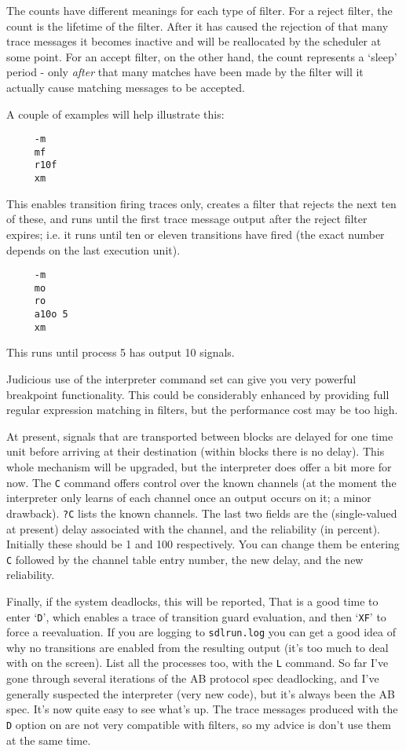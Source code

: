 The counts have different meanings for each type of filter. For a
reject filter, the count is the lifetime of the filter. After it has
caused the rejection of that many trace messages it becomes inactive
and will be reallocated by the scheduler at some point.
For an accept filter, on the other hand, the count represents a
`sleep' period - only {\em after} that many matches have been made
by the filter will it actually cause matching messages to be
accepted.

A couple of examples will help illustrate this:

\begin{verbatim}
     -m
     mf
     r10f
     xm
\end{verbatim}

This enables transition firing traces only, creates a filter that
rejects the next ten of these, and runs until the first trace message
output after the reject filter expires; i.e. it runs until ten or
eleven transitions have fired (the exact number depends on the last
execution unit).

\begin{verbatim}
     -m
     mo
     ro
     a10o 5
     xm
\end{verbatim}

This runs until process 5 has output 10 signals.

Judicious use of the interpreter command set can give you 
very powerful breakpoint functionality. This could be considerably
enhanced by providing full regular expression matching in filters,
but the performance cost may be too high.

At present, signals that are transported between blocks are delayed
for one time unit before arriving at their destination (within blocks
there is no delay). This whole mechanism will be upgraded, but the 
interpreter does offer a bit more for now. The {\tt C} command
offers control over the known channels (at the moment the interpreter 
only learns of each channel once an output occurs on it; a minor drawback).
{\tt ?C} lists the known channels. The last two fields are the
(single-valued at present) delay associated with the channel, and the
reliability (in percent). Initially these should be 1 and 100
respectively. You can change them be entering {\tt C} followed by
the channel table entry number, the new delay, and the new
reliability. 

Finally, if the system deadlocks, this will be reported, That is a
good time to enter `{\tt D}', which enables a trace of transition 
guard evaluation, and then `{\tt XF}' to force a reevaluation. If
you are logging to {\tt sdlrun.log} you can get a good idea of why
no transitions are enabled from the resulting output (it's too much
to deal with on the screen). List all the processes too, with the
{\tt L} command. So far I've gone through several iterations of 
the AB protocol spec deadlocking, and I've generally suspected the
interpreter (very new code), but it's always been the AB spec.
It's now quite easy to see what's up. The trace messages produced 
with the {\tt D} option on are not very compatible with filters,
so my advice is don't use them at the same time.

